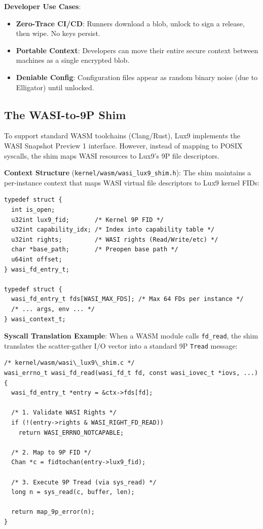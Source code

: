 \documentclass[11pt,letterpaper]{article}
\begin{document}
\textbf{Developer Use Cases}:
\begin{itemize}
    \item \textbf{Zero-Trace CI/CD}: Runners download a blob, unlock to sign a release, then wipe. No keys persist.
    \item \textbf{Portable Context}: Developers can move their entire secure context between machines as a single encrypted blob.
    \item \textbf{Deniable Config}: Configuration files appear as random binary noise (due to Elligator) until unlocked.
\end{itemize}

\subsection{The WASI-to-9P Shim}

To support standard WASM toolchains (Clang/Rust), Lux9 implements the WASI Snapshot Preview 1 interface. However, instead of mapping to POSIX syscalls, the shim maps WASI resources to Lux9's 9P file descriptors.

\textbf{Context Structure} (\texttt{kernel/wasm/wasi_lux9_shim.h}):
The shim maintains a per-instance context that maps WASI virtual file descriptors to Lux9 kernel FIDs:

\begin{lstlisting}
typedef struct {
  int is_open;
  u32int lux9_fid;       /* Kernel 9P FID */
  u32int capability_idx; /* Index into capability table */
  u32int rights;         /* WASI rights (Read/Write/etc) */
  char *base_path;       /* Preopen base path */
  u64int offset;
} wasi_fd_entry_t;

typedef struct {
  wasi_fd_entry_t fds[WASI_MAX_FDS]; /* Max 64 FDs per instance */
  /* ... args, env ... */
} wasi_context_t;
\end{lstlisting}

\textbf{Syscall Translation Example}:
When a WASM module calls \texttt{fd_read}, the shim translates the scatter-gather I/O vector into a standard 9P \texttt{Tread} message:

\begin{lstlisting}
/* kernel/wasm/wasi\_lux9\_shim.c */
wasi_errno_t wasi_fd_read(wasi_fd_t fd, const wasi_iovec_t *iovs, ...) {
  wasi_fd_entry_t *entry = &ctx->fds[fd];
  
  /* 1. Validate WASI Rights */
  if (!(entry->rights & WASI_RIGHT_FD_READ))
    return WASI_ERRNO_NOTCAPABLE;

  /* 2. Map to 9P FID */
  Chan *c = fidtochan(entry->lux9_fid);
  
  /* 3. Execute 9P Tread (via sys_read) */
  long n = sys_read(c, buffer, len);
  
  return map_9p_error(n);
}
\end{lstlisting}
\end{document}
